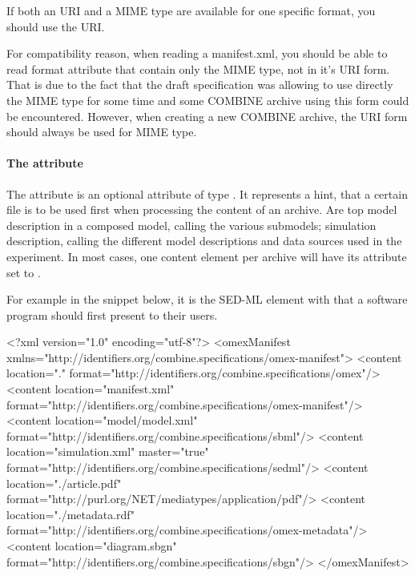 If both an  URI and a MIME type are available for one specific format, you should use the
 URI. 

For compatibility reason, when reading a manifest.xml, you should be able to read format
attribute that contain only the MIME type, not in it's URI form. That is due to the fact that the draft specification
was allowing to use directly the MIME type for some time and some COMBINE archive using this form could be encountered.
However, when creating a new COMBINE archive, the URI form should always be used for MIME type.

\paragraph{The  attribute}
\label{active_document}
The  attribute is an optional attribute of type . It 
represents a hint, that a certain file is to be used first when 
processing the content of an archive. Are top model description in a 
composed model, calling the various submodels; simulation description, 
calling the different model descriptions and data sources used in the 
experiment. In most cases, one content element per archive will have its  
attribute set to .

For example in the snippet below, it is the 
SED-ML element with  that a software 
program should first present to their users.

\begin{example}
<?xml version="1.0" encoding="utf-8"?>
<omexManifest xmlns="http://identifiers.org/combine.specifications/omex-manifest">
    <content location="." format="http://identifiers.org/combine.specifications/omex"/>
    <content location="manifest.xml" 
        format="http://identifiers.org/combine.specifications/omex-manifest"/>
    <content location="model/model.xml" format="http://identifiers.org/combine.specifications/sbml"/>
    <content location="simulation.xml" master="true"
        format="http://identifiers.org/combine.specifications/sedml"/>
    <content location="./article.pdf" format="http://purl.org/NET/mediatypes/application/pdf"/>
    <content location="./metadata.rdf"
        format="http://identifiers.org/combine.specifications/omex-metadata"/>
    <content location="diagram.sbgn" format="http://identifiers.org/combine.specifications/sbgn"/>
</omexManifest>
\end{example}

